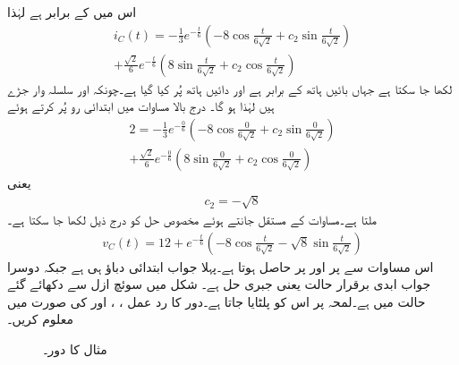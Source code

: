 اس میں  کے برابر ہے لہٰذا
\begin{multline*}
i_C(t)=-\frac{1}{3}e^{-\frac{t}{6}}\left(-8 \cos \frac{t}{6\sqrt{2}}+c_2 \sin \frac{t}{6\sqrt{2}}\right)\\+\frac{\sqrt{2}}{6}e^{-\frac{t}{6}}\left(8 \sin \frac{t}{6\sqrt{2}}+c_2 \cos \frac{t}{6\sqrt{2}}\right)
\end{multline*}
لکھا جا سکتا ہے جہاں بائیں ہاتھ  کے برابر ہے اور دائیں ہاتھ  پُر کیا گیا ہے۔چونکہ  اور  سلسلہ وار جڑے ہیں لہٰذا  ہو گا۔ درج بالا مساوات میں ابتدائی رو  پُر کرتے ہوئے
\begin{multline*}
2=-\frac{1}{3}e^{-\frac{0}{6}}\left(-8 \cos \frac{0}{6\sqrt{2}}+c_2 \sin \frac{0}{6\sqrt{2}}\right)\\
+\frac{\sqrt{2}}{6}e^{-\frac{0}{6}}\left(8 \sin \frac{0}{6\sqrt{2}}+c_2 \cos \frac{0}{6\sqrt{2}}\right)
\end{multline*}
یعنی
\begin{align*}
c_2=-\sqrt{8}
\end{align*}
ملتا ہے۔مساوات کے مستقل جانتے ہوئے مخصوص حل کو درج ذیل لکھا جا سکتا ہے۔
\begin{align}
v_C(t)=12+e^{-\frac{t}{6}}\left(-8\cos \frac{t}{6\sqrt{2}}-\sqrt{8}\sin \frac{t}{6\sqrt{2}} \right)
\end{align}
اس مساوات سے  پر  اور  پر  حاصل ہوتا ہے۔پہلا جواب ابتدائی دباؤ ہی ہے جبکہ دوسرا جواب ابدی برقرار حالت یعنی جبری حل ہے۔ 
شکل  میں سوئچ ازل سے دکھائے گئے حالت میں ہے۔لمحہ  پر اس کو پلٹایا جاتا ہے۔دور کا رد عمل ، ،  اور  کی صورت میں معلوم کریں۔
\begin{figure}
\centering
{}
\caption{مثال  کا دور۔}
\label{شکل_عارضی_مستطیل_دباو_ب}
\end{figure}

